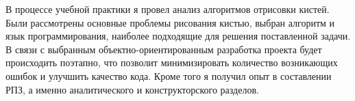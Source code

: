 \Conclusion %

В процессе учебной практики я провел анализ алгоритмов отрисовки кистей. Были рассмотрены основные проблемы рисования кистью, выбран алгоритм и язык программирования, наиболее подходящие для решения поставленной задачи.  
 В связи с выбранным объектно-ориентированным разработка проекта будет происходить поэтапно, что позволит минимизировать количество возникающих ошибок и улучшить качество кода. Кроме того я получил опыт в составлении РПЗ, а именно аналитического и конструкторского разделов.


